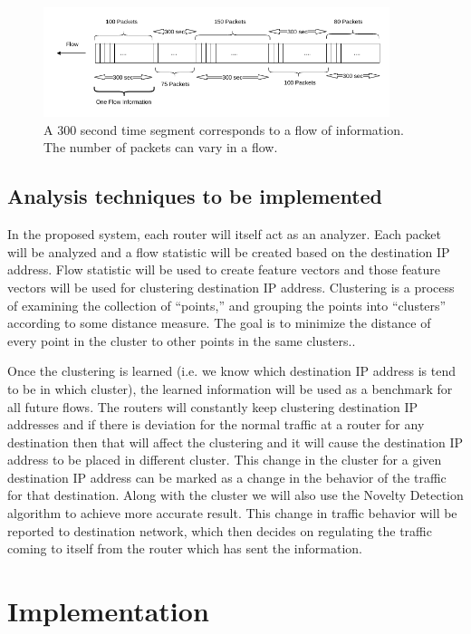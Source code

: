 \documentclass[12pt,oneside,a4paper]{article}
\begin{document}
\begin{figure}[H]
\centering
\includegraphics[width=0.90\textwidth]{Data_Flow_Capture.png}
\caption{A 300 second time segment corresponds to a flow of information. The number of packets can vary in a flow.} \label{fig:flow}
\end{figure}

\subsection{Analysis techniques to be implemented}
In the proposed system, each router will itself act as an analyzer. Each packet will be analyzed and a flow statistic will be created based on the destination IP address. Flow statistic will be used to create feature vectors and those feature vectors will be used for clustering destination IP address. Clustering is a process of examining the collection of “points,” and grouping the points into “clusters” according to some distance measure. The goal is to minimize the distance of every point in the cluster to other points in the same clusters.\cite{machine-learning}.

Once the clustering is learned (i.e. we know which destination IP address is tend to be in which cluster), the learned information will be used as a benchmark for all future flows. The routers will constantly keep clustering destination IP addresses and if there is deviation for the normal traffic at a router for any destination then that will affect the clustering and it will cause the destination IP address to be placed in different cluster. This change in the cluster for a given destination IP address can be marked as a change in the behavior of the traffic for that destination. Along with the cluster we will also use the Novelty Detection algorithm to achieve more accurate result. This change in traffic behavior will be reported to destination network, which then decides on regulating the traffic coming to itself from the router which has sent the information.

\section{Implementation} \label{sec:Implementation}
\end{document}

